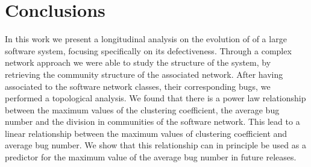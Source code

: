 \section{Conclusions}
\label{Conclusions}
In this work we present a longitudinal analysis on the evolution of of a large software system, 
focusing specifically on its defectiveness.
Through a complex network approach we were able to study the structure of the system, 
by retrieving the community structure of the associated 
network. After having associated to the software network classes, their corresponding bugs, we performed 
a topological analysis.
We found that there is a power law relationship between the maximum values of the clustering coefficient, 
the average bug number 
and the division in communities of the software network. 
This lead to a linear relationship between the maximum values of clustering coefficient and average bug number.
We show that this relationship can in principle be used as a predictor for the maximum value of the average 
bug number in future releases. 

